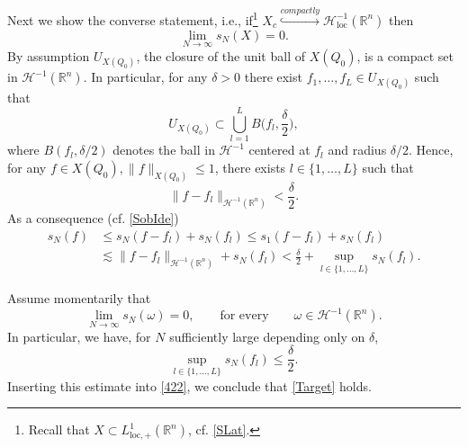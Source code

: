 \documentclass[11pt, a4paper,leqno]{amsart}
\theoremstyle{plain}
\numberwithin{equation}{section}
\theoremstyle{definition}
\theoremstyle{remark}
\def\R{\mathbb{R}}
\begin{document}
Next we show the converse statement, i.e., if\footnote{Recall that $X \subset L^1_{\text{loc}, +}(\R^n)$, cf. \eqref{SLat}.}  $X_{c}\overset{compactly}{\hookrightarrow}\mathcal{H}_{\text{loc}}^{-1}(\R^n)$  then
\begin{equation}\label{Target}
	\lim_{N \to \infty} s_N(X) =0. 
\end{equation}
By assumption $U_{X(Q_0)}$, the closure of the unit ball of $X(Q_0)$, is a  compact set in $\mathcal{H}^{-1}(\R^n)$. In particular, for any $\delta > 0$ there exist $f_1, \ldots, f_L \in U_{X(Q_0)}$ such that
$$
	U_{X(Q_0)} \subset\bigcup_{l=1}^{L}B\Big(f_{l},\frac{\delta}{2}\Big),
$$
where $B(f_{l},\delta/2)$ denotes the ball in $\mathcal{H}^{-1}$ centered at $f_l$ and radius $\delta/2$. Hence, for any $f \in X(Q_0), \|f\|_{X(Q_0)} \leq 1$, there exists $l \in \{1, \ldots, L\}$ such that
$$
	\|f-f_l\|_{\mathcal{H}^{-1}(\R^n)} < \frac{\delta}{2}. 
$$
As a consequence (cf. \eqref{SobIde})
\begin{align}
	s_N(f) &\leq s_N(f-f_l) + s_N(f_l)  \leq s_1 (f-f_l) + s_N(f_l) \nonumber \\
	& \lesssim \|f-f_l\|_{\mathcal{H}^{-1}(\R^n)} + s_N(f_l)  < \frac{\delta}{2} + \sup_{l \in \{1, \ldots, L\}}s_N(f_l). \label{422} 
\end{align}

Assume momentarily that
\begin{equation}\label{ClaimSob}
	\lim_{N \to \infty} s_N(\omega) = 0, \qquad \text{for every} \qquad \omega \in \mathcal{H}^{-1}(\R^n). 
\end{equation}
In particular,  we have, for $N$ sufficiently large depending only on $\delta$, 
$$
	 \sup_{l \in \{1, \ldots, L\}} s_N(f_l) \leq \frac{\delta}{2}.
$$
Inserting this estimate into \eqref{422}, we conclude that \eqref{Target} holds. 
\end{document}
